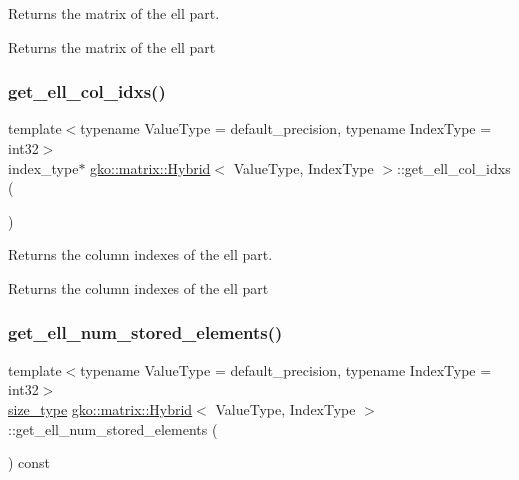 Returns the matrix of the ell part. 

\begin{DoxyReturn}{Returns}
the matrix of the ell part 
\end{DoxyReturn}
\mbox{\label{classgko_1_1matrix_1_1Hybrid_ac46548ef106a6b8fe32219d3e11aab22}} 
\subsubsection{\texorpdfstring{get\+\_\+ell\+\_\+col\+\_\+idxs()}{get\_ell\_col\_idxs()}}
{\footnotesize\ttfamily template$<$typename Value\+Type = default\+\_\+precision, typename Index\+Type = int32$>$ \\
index\+\_\+type$\ast$ \hyperlink{classgko_1_1matrix_1_1Hybrid}{gko\+::matrix\+::\+Hybrid}$<$ Value\+Type, Index\+Type $>$\+::get\+\_\+ell\+\_\+col\+\_\+idxs (\begin{DoxyParamCaption}{ }\end{DoxyParamCaption})\hspace{0.3cm}{\ttfamily [noexcept]}}



Returns the column indexes of the ell part. 

\begin{DoxyReturn}{Returns}
the column indexes of the ell part 
\end{DoxyReturn}
\mbox{\label{classgko_1_1matrix_1_1Hybrid_a99ab36f3aeae944db440a8bbe324aaff}} 
\subsubsection{\texorpdfstring{get\+\_\+ell\+\_\+num\+\_\+stored\+\_\+elements()}{get\_ell\_num\_stored\_elements()}}
{\footnotesize\ttfamily template$<$typename Value\+Type = default\+\_\+precision, typename Index\+Type = int32$>$ \\
\hyperlink{namespacegko_a6e5c95df0ae4e47aab2f604a22d98ee7}{size\+\_\+type} \hyperlink{classgko_1_1matrix_1_1Hybrid}{gko\+::matrix\+::\+Hybrid}$<$ Value\+Type, Index\+Type $>$\+::get\+\_\+ell\+\_\+num\+\_\+stored\+\_\+elements (\begin{DoxyParamCaption}{ }\end{DoxyParamCaption}) const\hspace{0.3cm}{\ttfamily [noexcept]}}



